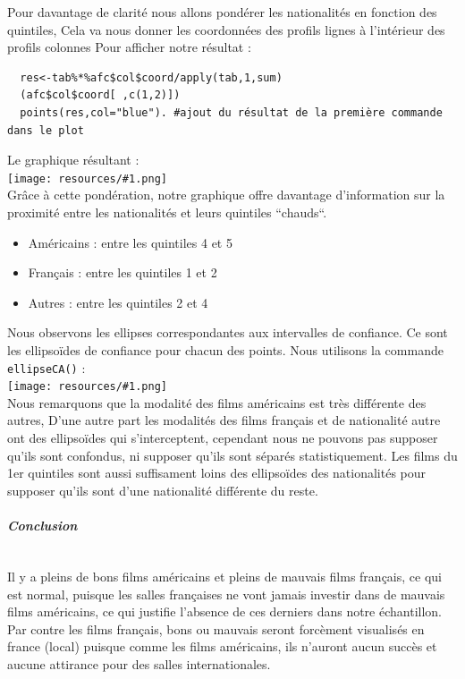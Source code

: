 \documentclass{report}
\newcommand{\photo}[1]{\\
    \texttt{[image: resources/\#1.png]}
\\
}
\begin{document}
Pour davantage de clarité nous allons pondérer les nationalités en fonction des quintiles,
Cela va nous donner les coordonnées des profils lignes à l’intérieur des profils colonnes
Pour afficher notre résultat :
\begin{verbatim}
  res<-tab%*%afc$col$coord/apply(tab,1,sum)
  (afc$col$coord[ ,c(1,2)])
  points(res,col="blue"). #ajout du résultat de la première commande dans le plot
\end{verbatim}
Le graphique résultant :
\photo{34}
Grâce à cette pondération, notre graphique offre davantage d'information sur la proximité entre
les nationalités et leurs quintiles ``chauds``.
\begin{itemize}
  \item Américains : entre les quintiles 4 et 5
  \item Français : entre les quintiles 1 et 2
  \item Autres : entre les quintiles 2 et 4
\end{itemize}
Nous observons les ellipses correspondantes aux intervalles de confiance. Ce sont les ellipsoïdes
de confiance pour chacun des points.
Nous utilisons la commande \texttt{ellipseCA()} :
\photo{36}
Nous remarquons que la modalité des films américains est très différente des autres, D'une autre
part les modalités des films français et de nationalité autre ont des ellipsoïdes qui s'interceptent,
cependant nous ne pouvons pas supposer qu'ils sont confondus, ni supposer qu'ils sont séparés
statistiquement. Les films du 1er quintiles sont aussi suffisament loins des ellipsoïdes des nationalités
pour supposer qu'ils sont d'une nationalité différente du reste.
\subparagraph{Conclusion} \begin{verbatim}\end{verbatim}
Il y a pleins de bons films américains et pleins de mauvais films français, ce qui est normal,
puisque les salles françaises ne vont jamais investir dans de mauvais films américains, ce qui
justifie l'absence de ces derniers dans notre échantillon. Par contre les films français, bons ou
mauvais seront forcèment visualisés en france (local) puisque comme les films américains, ils n'auront
aucun succès et aucune attirance pour des salles internationales.
\end{document}
